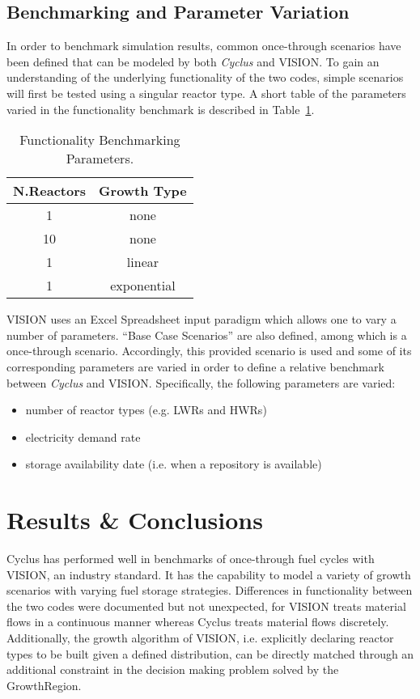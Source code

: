 \documentclass{anstrans}
\begin{document}
\subsection{Benchmarking and Parameter Variation}
In order to benchmark simulation results, common once-through scenarios have been defined that can be modeled by both \emph{Cyclus} and VISION. To gain an 
understanding of the underlying functionality of the two codes, simple scenarios will first be tested using a singular reactor type. A short table of the
parameters varied in the functionality benchmark is described in Table~\ref{tab:scenarioparams}.
\begin{table} [h]
\centering
\begin{tabular} {|c|c|} 
\hline
N.Reactors & Growth Type \\
\hline
1          & none        \\
10         & none        \\
1          & linear      \\
1          & exponential \\
\hline
\end{tabular}
  \caption{Functionality Benchmarking Parameters.}
  \label{tab:scenarioparams}
\end{table}
VISION uses an Excel Spreadsheet input paradigm which allows one to vary a number of parameters. ``Base Case Scenarios'' are also defined, among which is a once-through scenario.
Accordingly, this provided scenario is used and some of its corresponding parameters are varied in order to define a relative benchmark between \emph{Cyclus} and
VISION. Specifically, the following parameters are varied:
\begin{itemize}
\item number of reactor types (e.g. LWRs and HWRs)
\item electricity demand rate
\item storage availability date (i.e. when a repository is available)
\end{itemize}
\section{Results \& Conclusions}
Cyclus has performed well in benchmarks of once-through fuel cycles with VISION, an industry standard. It has the capability to model a variety of growth scenarios 
with varying fuel storage strategies. Differences in functionality between the two codes were documented but not unexpected, for VISION treats material flows in 
a continuous manner whereas Cyclus treats material flows discretely. Additionally, the growth algorithm of VISION, i.e. explicitly declaring reactor types
to be built given a defined distribution, can be directly matched through an additional constraint in the decision making problem solved by the GrowthRegion.
\end{document}
